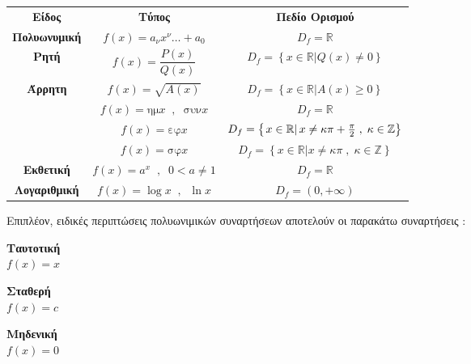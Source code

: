 \documentclass[twoside,10pt]{book}
\DeclareRobustCommand{\frac}[3][0pt]{%
{\begingroup\hspace{#1}#2\hspace{#1}\endgroup\over\hspace{#1}#3\hspace{#1}}}
\newcommand{\hm}[1]{\textrm{ημ}#1}
\newcommand{\syn}[1]{\textrm{συν}#1}
\newcommand{\ef}[1]{\textrm{εφ}#1}
\newcommand{\syf}[1]{\textrm{σφ}#1}
\begin{document}
\begin{center}
\begin{longtable}{ccc}
\hline \rule[-2ex]{0pt}{5.5ex}\textbf{Είδος} & \textbf{Τύπος} & \textbf{Πεδίο Ορισμού} \\ 
\hhline{===} \rule[-2ex]{0pt}{5.5ex} \textbf{Πολυωνυμική} & $ f(x)=a_\nu x^\nu\ldots+a_0 $ & $ D_f=\mathbb{R} $ \\
\rule[-2ex]{0pt}{5.5ex} \textbf{Ρητή} & $ f(x)=\dfrac{P(x)}{Q(x)} $ & $ D_f=\left\lbrace\left.  x\in\mathbb{R}\right| Q(x)\neq0\right\rbrace $  \\
\rule[-2ex]{0pt}{5.5ex} \textbf{Άρρητη} & $ f(x)=\sqrt{A(x)} $ & $ D_f=\left\lbrace\left. x\in\mathbb{R}\right| A(x)\geq0\right\rbrace $ \\
\hhline{~--}\rule[-2ex]{0pt}{5.5ex} \multirow{5}{*}{\textbf{Τριγωνομετρική}} & $ f(x)=\hm{x}\;\;,\;\;\syn{x} $ & $ D_f=\mathbb{R} $ \\ 
\rule[-2ex]{0pt}{5.5ex}  & $ f(x)=\ef{x} $ & $ D_f=\left\lbrace\left.x\in\mathbb{R}\right| x\neq\kappa\pi+\frac{\pi}{2}\;,\;\kappa\in\mathbb{Z}\right\rbrace $ \\ 
\rule[-2ex]{0pt}{5.5ex}  & $ f(x)=\syf{x} $ & $ D_f=\left\lbrace\left.x\in\mathbb{R}\right| x\neq\kappa\pi\;,\;\kappa\in\mathbb{Z}\right\rbrace $ \\ 
\hhline{~--}\rule[-2ex]{0pt}{5.5ex} \textbf{Εκθετική} & $ f(x)=a^x\;\;,\;\;0<a\neq1 $ & $ D_f=\mathbb{R} $ \\ 
\rule[-2ex]{0pt}{5.5ex} \textbf{Λογαριθμική} & $ f(x)=\log{x}\;\;,\;\;\ln{x} $ & $ D_f=(0,+\infty) $ \\ 
\hline 
\end{longtable}
\end{center}
Επιπλέον, ειδικές περιπτώσεις πολυωνιμικών συναρτήσεων αποτελούν οι παρακάτω συναρτήσεις :
\begin{center}
\begin{minipage}{2.5cm}
\textbf{Ταυτοτική}\\$ f(x)=x $
\end{minipage}\qquad
\begin{minipage}{2.5cm}
\textbf{Σταθερή}\\$ f(x)=c $
\end{minipage}\qquad
\begin{minipage}{2.5cm}
\textbf{Μηδενική}\\$ f(x)=0 $
\end{minipage}
\end{center}
\vspace{2mm}
\end{document}
